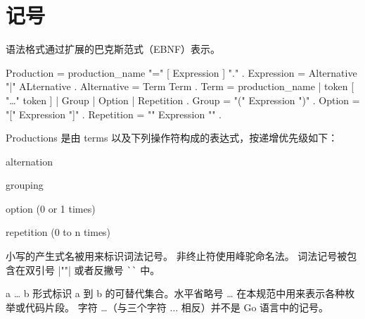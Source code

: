 
\chapter{记号}
语法格式通过扩展的巴克斯范式（EBNF）表示。
\begin{EBNF}
Production	= production_name "=" [ Expression ] "." .
Expression 	= Alternative { "|" ALternative } .
Alternative = Term { Term } .
Term        = production_name | token [ "…" token ] | Group | Option | Repetition .
Group       = "(" Expression ")" .
Option      = "[" Expression "]" .
Repetition  = "{" Expression "}" .
\end{EBNF}

Productions 是由 terms 以及下列操作符构成的表达式，按递增优先级如下：
\begin{description}[font=\ttfamily\bfseries, style=nextline, leftmargin=2\parindent, labelindent=\parindent]
	\item [|] alternation
	\item [()] grouping
	\item [{[]}] option (0 or 1 times)
	\item [\{\}] repetition (0 to n times)
\end{description}
小写的产生式名被用来标识词法记号。
非终止符使用峰驼命名法。
词法记号被包含在双引号 \code|""| 或者反撇号 \lstinline|``| 中。

 a \dots{} b 形式标识 a 到 b 的可替代集合。水平省略号 \dots{} 在本规范中用来表示各种枚举或代码片段。
 字符 \dots（与三个字符 $\ldots$ 相反）并不是 Go 语言中的记号。